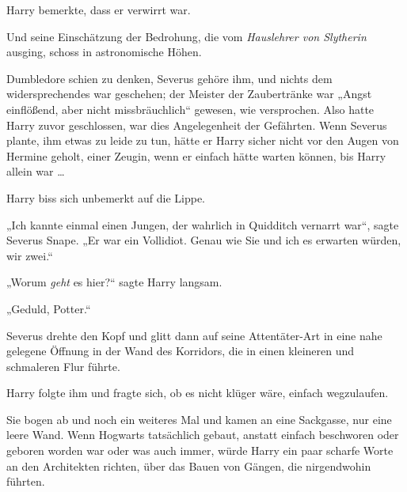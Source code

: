 Harry bemerkte, dass er verwirrt war.

Und seine Einschätzung der Bedrohung, die vom \emph{Hauslehrer von Slytherin} ausging, schoss in astronomische Höhen.

Dumbledore schien zu denken, Severus gehöre ihm, und nichts dem widersprechendes war geschehen; der Meister der Zaubertränke war
„Angst einflößend, aber nicht missbräuchlich“ gewesen, wie versprochen. Also hatte Harry zuvor geschlossen, war dies Angelegenheit der Gefährten. Wenn Severus plante, ihm etwas zu leide zu tun, hätte er Harry sicher nicht vor den Augen von Hermine geholt, einer Zeugin, wenn er einfach hätte warten können, bis Harry allein war …

Harry biss sich unbemerkt auf die Lippe.

„Ich kannte einmal einen Jungen, der wahrlich in Quidditch vernarrt war“, sagte Severus Snape.
„Er war ein Vollidiot. Genau wie Sie und ich es erwarten würden, wir zwei.“

„Worum \emph{geht} es hier?“ sagte Harry langsam.

„Geduld, Potter.“

Severus drehte den Kopf und glitt dann auf seine Attentäter-Art in eine nahe gelegene Öffnung in der Wand des Korridors, die in einen kleineren und schmaleren Flur führte.

Harry folgte ihm und fragte sich, ob es nicht klüger wäre, einfach wegzulaufen.

Sie bogen ab und noch ein weiteres Mal und kamen an eine Sackgasse, nur eine leere Wand. Wenn Hogwarts tatsächlich gebaut, anstatt einfach beschworen oder geboren worden war oder was auch immer, würde Harry ein paar scharfe Worte an den Architekten richten, über das Bauen von Gängen, die nirgendwohin führten.

